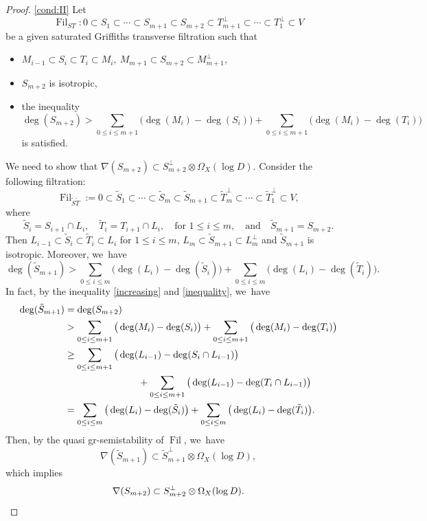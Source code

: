 \documentclass[JEP,XML,SOM,Unicode,published]{cedram}
\DeclareMathOperator{\Filt}{Fil}
\theoremstyle{plain}
\theoremstyle{definition}
\begin{document}
\begin{proof}
\eqref{cond:II}
Let
\[
\Filt_{ST}:0\subset S_1 \subset \cdots\subset S_{m+1}\subset S_{m+2}\subset T_{m+1}^\perp\subset\cdots \subset T_1^\perp\subset V
\]
be a given saturated Griffiths transverse filtration such that
\begin{itemize}
\item $M_{i-1}\subset S_i \subset T_i \subset M_i,\ M_{m+1}\subset S_{m+2}\subset M_{m+1}^\perp$,
\item $S_{m+2}$ is isotropic,
\item the inequality
\begin{equation}\label{inequality}
\deg(S_{m+2})>\sum_{0\leq i\leq m+1}\big(\deg(M_i)-\deg(S_i)\big)+\sum_{0\leq i\leq m+1}\big(\deg(M_i)-\deg(T_i)\big)
\end{equation}
is satisfied.
\end{itemize}
We need to show that $\nabla(S_{m+2})\subset S_{m+2}^\perp\otimes \Omega_X(\log D)$. Consider the following filtration:
\[
\Filt_{\tilde{S}\tilde{T}}:=0\subset \tilde{S}_1\subset \cdots\subset \tilde{S}_m\subset \tilde{S}_{m+1}\subset \tilde{T}_m^\perp\subset\cdots \subset \tilde{T}_1^\perp\subset V,
\]
where
\[
\tilde{S}_i=S_{i+1}\cap L_i,\quad \tilde{T}_i=T_{i+1}\cap L_i,\quad \text{for $1\leq i\leq m$},\quad\text{and}\quad\tilde{S}_{m+1}=S_{m+2}.
\]
Then $L_{i-1}\subset \tilde{S}_i\subset \tilde{T}_i\subset L_i$ for $1\leq i\leq m$, $L_m\subset\tilde{S}_{m+1}\subset L_m^\perp$ and $\tilde{S}_{m+1}$ is isotropic. Moreover, we~have
\[
\deg(\tilde{S}_{m+1})>\sum_{0\leq i\leq m}\big(\deg(L_i)-\deg(\tilde{S}_i)\big)+\sum_{0\leq i\leq m}\big(\deg(L_i)-\deg(\tilde{T}_i)\big).
\]
In fact, by the inequality \ref{increasing} and \ref{inequality}, we~have
\begin{equation}
\begin{split}
\deg(\tilde{S}_{m+1})&=\deg(S_{m+2})\\
&>\sum_{0\leq i\leq m+1}\big(\deg(M_i)-\deg(S_i)\big)+\sum_{0\leq i\leq m+1}\big(\deg(M_i)-\deg(T_i)\big)\\
&\geq \sum_{0\leq i\leq m+1}\big(\deg(L_{i-1})-\deg(S_i\cap L_{i-1})\big) \\
& \hspace*{2.7cm}+\sum_{0\leq i\leq m+1}\big(\deg(L_{i-1})-\deg(T_i\cap L_{i-1})\big)\\
&=\sum_{0\leq i\leq m}\big(\deg(L_i)-\deg(\tilde{S}_i)\big)+\sum_{0\leq i\leq m}\big(\deg(L_i)-\deg(\tilde{T}_i)\big).
\end{split}
\end{equation}
Then, by the quasi gr-semistability of $\Filt$, we~have
\[
\nabla(\tilde{S}_{m+1})\subset\tilde{S}_{m+1}^\perp\otimes\Omega_X(\log D),
\]
which implies
\[
\nabla(S_{m+2})\subset S_{m+2}^\perp\otimes \Omega_X(\log D).\qedhere
\]
\end{proof}
\end{document}
